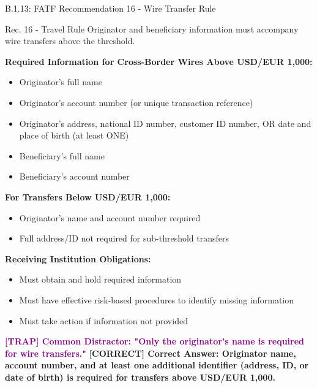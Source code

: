 \documentclass[11pt,a4paper]{beamer}
\newcommand{\trap}[1]{\textcolor{purple}{\textbf{[TRAP] #1}}}
\newcommand{\correct}[1]{\textcolor{green!50!black}{\textbf{[CORRECT] #1}}}
\begin{document}
	\begin{frame}{B.1.13: FATF Recommendation 16 - Wire Transfer Rule}
		\begin{block}{Rec. 16 - Travel Rule}
			Originator and beneficiary information must accompany wire transfers above the threshold.
		\end{block}
		\textbf{Required Information for Cross-Border Wires Above USD/EUR 1,000:}
		\begin{itemize}
			\item Originator's full name
			\item Originator's account number (or unique transaction reference)
			\item Originator's address, national ID number, customer ID number, OR date and place of birth (at least ONE)
			\item Beneficiary's full name
			\item Beneficiary's account number
		\end{itemize}
		\textbf{For Transfers Below USD/EUR 1,000:}
		\begin{itemize}
			\item Originator's name and account number required
			\item Full address/ID not required for sub-threshold transfers
		\end{itemize}
		\textbf{Receiving Institution Obligations:}
		\begin{itemize}
			\item Must obtain and hold required information
			\item Must have effective risk-based procedures to identify missing information
			\item Must take action if information not provided
		\end{itemize}
		\trap{Common Distractor: "Only the originator's name is required for wire transfers."}
		\correct{Correct Answer: Originator name, account number, and at least one additional identifier (address, ID, or date of birth) is required for transfers above USD/EUR 1,000.}
	\end{frame}
	
\end{document}

